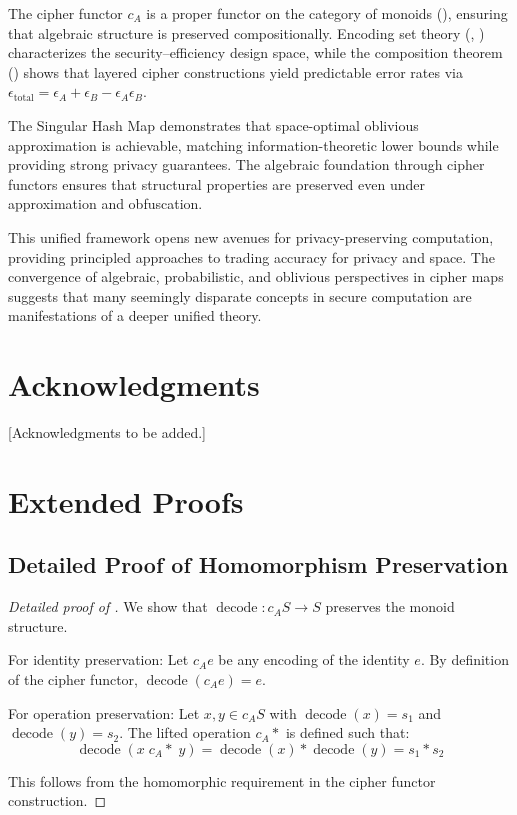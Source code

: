 \documentclass[11pt]{article}
\theoremstyle{definition}
\theoremstyle{plain}
\theoremstyle{remark}
\newcommand{\cipher}[1]{c_{#1}}
\newcommand{\decode}{\operatorname{decode}}
\begin{document}
The cipher functor $\cipher{A}$ is a proper functor on the category of monoids (), ensuring that algebraic structure is preserved compositionally. Encoding set theory (, ) characterizes the security--efficiency design space, while the composition theorem () shows that layered cipher constructions yield predictable error rates via $\epsilon_{\text{total}} = \epsilon_A + \epsilon_B - \epsilon_A \epsilon_B$.

The Singular Hash Map demonstrates that space-optimal oblivious approximation is achievable, matching information-theoretic lower bounds while providing strong privacy guarantees. The algebraic foundation through cipher functors ensures that structural properties are preserved even under approximation and obfuscation.

This unified framework opens new avenues for privacy-preserving computation, providing principled approaches to trading accuracy for privacy and space. The convergence of algebraic, probabilistic, and oblivious perspectives in cipher maps suggests that many seemingly disparate concepts in secure computation are manifestations of a deeper unified theory.

\section*{Acknowledgments}

[Acknowledgments to be added.]




\appendix

\section{Extended Proofs}

\subsection{Detailed Proof of Homomorphism Preservation}

\begin{proof}[Detailed proof of ]
We show that $\decode: \cipher{A}S \to S$ preserves the monoid structure.

For identity preservation:
Let $\cipher{A}e$ be any encoding of the identity $e$. By definition of the cipher functor, $\decode(\cipher{A}e) = e$.

For operation preservation:
Let $x, y \in \cipher{A}S$ with $\decode(x) = s_1$ and $\decode(y) = s_2$.
The lifted operation $\cipher{A}*$ is defined such that:
$$\decode(x \;\cipher{A}*\; y) = \decode(x) * \decode(y) = s_1 * s_2$$

This follows from the homomorphic requirement in the cipher functor construction.
\end{proof}
\end{document}
